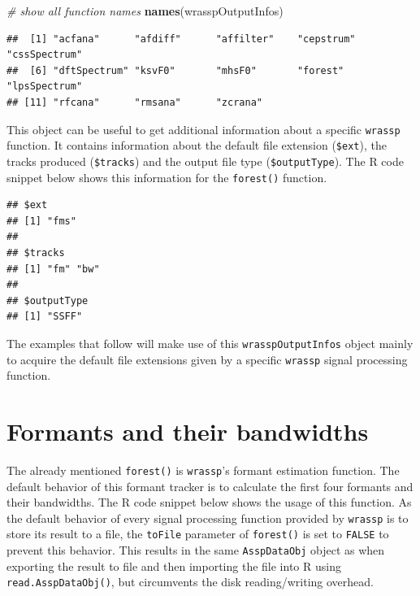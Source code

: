 \documentclass[]{book}
\newenvironment{Shaded}{\begin{snugshade}}{\end{snugshade}}
\newcommand{\CommentTok}[1]{\textcolor[rgb]{0.56,0.35,0.01}{\textit{#1}}}
\newcommand{\KeywordTok}[1]{\textcolor[rgb]{0.13,0.29,0.53}{\textbf{#1}}}
\newcommand{\NormalTok}[1]{#1}
\newcommand{\OperatorTok}[1]{\textcolor[rgb]{0.81,0.36,0.00}{\textbf{#1}}}
\theoremstyle{definition}
\theoremstyle{definition}
\theoremstyle{definition}
\theoremstyle{remark}
\begin{document}
\begin{Shaded}
\begin{Highlighting}[]
\CommentTok{# show all function names}
\KeywordTok{names}\NormalTok{(wrasspOutputInfos)}
\end{Highlighting}
\end{Shaded}

\begin{verbatim}
##  [1] "acfana"      "afdiff"      "affilter"    "cepstrum"    "cssSpectrum"
##  [6] "dftSpectrum" "ksvF0"       "mhsF0"       "forest"      "lpsSpectrum"
## [11] "rfcana"      "rmsana"      "zcrana"
\end{verbatim}

This object can be useful to get additional information about a specific
\texttt{wrassp} function. It contains information about the default file
extension (\texttt{\$ext}), the tracks produced (\texttt{\$tracks}) and
the output file type (\texttt{\$outputType}). The R code snippet below
shows this information for the \texttt{forest()} function.

\begin{Shaded}
\end{Shaded}

\begin{verbatim}
## $ext
## [1] "fms"
## 
## $tracks
## [1] "fm" "bw"
## 
## $outputType
## [1] "SSFF"
\end{verbatim}

The examples that follow will make use of this
\texttt{wrasspOutputInfos} object mainly to acquire the default file
extensions given by a specific \texttt{wrassp} signal processing
function.

\hypertarget{subsec:wrassp-formants}{%
\section{Formants and their bandwidths}\label{subsec:wrassp-formants}}

The already mentioned \texttt{forest()} is \texttt{wrassp}'s formant
estimation function. The default behavior of this formant tracker is to
calculate the first four formants and their bandwidths. The R code
snippet below shows the usage of this function. As the default behavior
of every signal processing function provided by \texttt{wrassp} is to
store its result to a file, the \texttt{toFile} parameter of
\texttt{forest()} is set to \texttt{FALSE} to prevent this behavior.
This results in the same \texttt{AsspDataObj} object as when exporting
the result to file and then importing the file into R using
\texttt{read.AsspDataObj()}, but circumvents the disk reading/writing
overhead.
\end{document}
